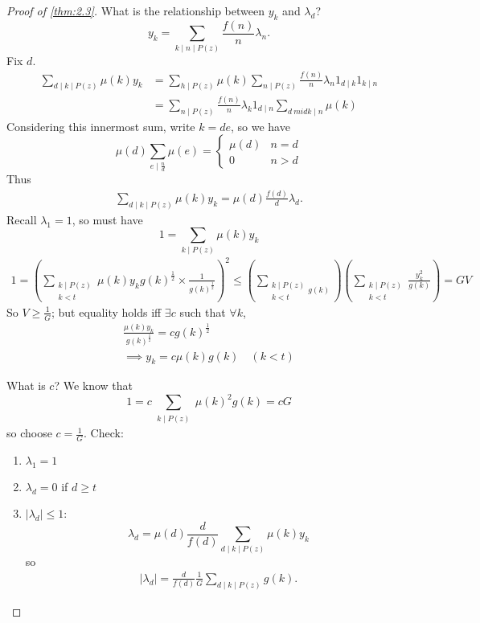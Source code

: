 \documentclass{article}
\begin{document}
\begin{proof}[Proof of \cref{thm:2.3}]
What is the relationship between $y_k$ and $\lambda_d$?
\begin{equation*}
  y_k = \sum_{k \mid n \mid P(z)} \frac{f(n)}{n} \lambda_n.
\end{equation*}
Fix $d$.
\begin{align*}
  \sum_{d \mid k \mid P(z)} \mu(k) y_k &= \sum_{h \mid P(z)} \mu(k) \sum_{n \mid P(z)} \frac{f(n)}{n} \lambda_n 1_{d \mid k} 1_{k \mid n} \\
                                       &= \sum_{n \mid P(z)} \frac{f(n)}{n} \lambda_{k} 1_{d \mid n} \sum_{d\ mid k \mid n} \mu(k)
\end{align*}
Considering this innermost sum, write $k = de$, so we have
\begin{equation*}
  \mu(d) \sum_{e \mid \frac{n}{d}} \mu(e) =
  \begin{cases}
    \mu(d) & n = d \\
    0 & n > d
  \end{cases}
\end{equation*}
Thus
\begin{align*}
  \sum_{d \mid k \mid P(z)} \mu(k) y_k = \mu(d) \frac{f(d)}{d} \lambda_d.
\end{align*}
Recall $\lambda_1=1$, so must have
\begin{equation*}1 = \sum_{k \mid P(z)} \mu(k) y_k\end{equation*}
\begin{align*}
  1 = \left(\sum_{\substack{k \mid P(z) \\ k < t}} \mu(k) y_k g(k)^{\frac 12} \times \frac{1}{g(k)^{\frac 12}}\right)^2 \leq \left(\sum_{\substack{k \mid P(z) \\ k<t} g(k)}\right) \left(\sum_{\substack{k \mid P(z) \\ k < t}} \frac{y_k^2}{g(k)}\right) = GV
\end{align*}
So $V \geq \frac{1}{G}$; but equality holds iff $\exists c$ such that $\forall k$,
\begin{align*}
  \frac{\mu(k) y_k}{g(k)^{\frac{1}{2}}} = c g(k)^{\frac 12} \\
  \implies y_k = c \mu(k) g(k) \quad (k < t)
\end{align*}

What is $c$? We know that
\begin{equation*}
  1 = c \sum_{\substack{k \mid P(z)}} \mu(k)^2 g(k) = cG
\end{equation*}
so choose $c = \frac{1}{G}$. Check:
\begin{enumerate}
  \item $\lambda_1 = 1$ \checkmark
  \item $\lambda_d = 0$ if $d \geq t$ \checkmark
  \item $|\lambda_d| \leq 1$:
    \begin{equation*}
      \lambda_d = \mu(d) \frac{d}{f(d)} \sum_{d \mid k \mid P(z)} \mu(k) y_k
    \end{equation*}
    so
    \begin{align*}
      |\lambda_d| = \frac{d}{f(d)} \frac{1}{G} \sum_{d \mid k \mid P(z)} g(k).
    \end{align*}


\end{enumerate}
\end{proof}
\end{document}
